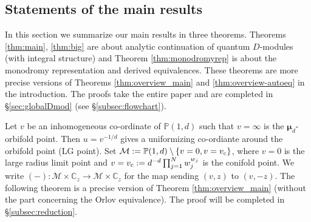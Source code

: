 \documentclass[11pt]{amsart}
\theoremstyle{definition} %
\theoremstyle{remark} %
\newcommand{\CC}{\mathbb C}
\newcommand{\PP}{\mathbb P}
\newcommand{\bmu}{\boldsymbol{\mu}}
\newcommand{\cM}{\mathcal{M}}
\newcommand{\vc}{v_{\rm c}}
\begin{document}
\subsection{Statements of the main results}  
\label{subsec:main-statement}
In this section we summarize our main results 
in three theorems. Theorems \ref{thm:main}, \ref{thm:big} 
are about analytic continuation of quantum $D$-modules 
(with integral structure) and Theorem \ref{thm:monodromyrep} 
is about the monodromy representation and derived equivalences. 
These theorems are more precise versions of
Theorems \ref{thm:overview_main} and \ref{thm:overview-autoeq} 
in the introduction. 
The proofs take the entire paper 
and are completed in \S \ref{sec:globalDmod} 
(see \S \ref{subsec:flowchart}). 

Let $v$ be an inhomogeneous co-ordinate of $\PP(1,d)$ 
such that $v=\infty$ is the $\bmu_d$-orbifold point. 
Then $u=v^{-1/d}$ gives a uniformizing co-ordiante 
around the orbifold point (LG point). 
Set $\cM:=\PP(1,d)\setminus \{ v =0 ,v= \vc\}$, 
where $v=0$ is the large radius limit point 
and $v=\vc:= d^{-d} \prod_{j=1}^N w_j^{w_j}$ 
is the conifold point. 
We write $(-) \colon \cM\times \CC_z \to \cM\times \CC_z$ 
for the map sending $(v,z)$ to $(v,-z)$. 
The following theorem is a precise version of 
Theorem \ref{thm:overview_main} 
(without the part concerning the Orlov equivalence). 
The proof will be completed in \S \ref{subsec:reduction}. 
\end{document}

